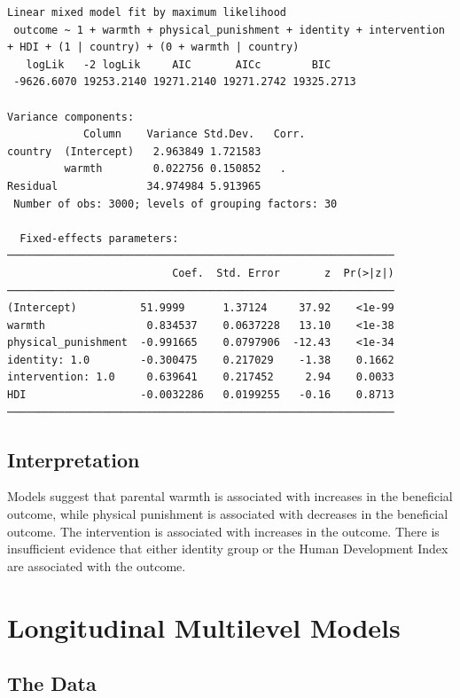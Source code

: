 \documentclass[
  letterpaper,
  DIV=11,
  numbers=noendperiod]{scrreprt}
\begin{document}
\begin{verbatim}
Linear mixed model fit by maximum likelihood
 outcome ~ 1 + warmth + physical_punishment + identity + intervention + HDI + (1 | country) + (0 + warmth | country)
   logLik   -2 logLik     AIC       AICc        BIC    
 -9626.6070 19253.2140 19271.2140 19271.2742 19325.2713

Variance components:
            Column    Variance Std.Dev.   Corr.
country  (Intercept)   2.963849 1.721583
         warmth        0.022756 0.150852   .  
Residual              34.974984 5.913965
 Number of obs: 3000; levels of grouping factors: 30

  Fixed-effects parameters:
─────────────────────────────────────────────────────────────
                          Coef.  Std. Error       z  Pr(>|z|)
─────────────────────────────────────────────────────────────
(Intercept)          51.9999      1.37124     37.92    <1e-99
warmth                0.834537    0.0637228   13.10    <1e-38
physical_punishment  -0.991665    0.0797906  -12.43    <1e-34
identity: 1.0        -0.300475    0.217029    -1.38    0.1662
intervention: 1.0     0.639641    0.217452     2.94    0.0033
HDI                  -0.0032286   0.0199255   -0.16    0.8713
─────────────────────────────────────────────────────────────
\end{verbatim}

\section{Interpretation}\label{interpretation-2}

Models suggest that parental warmth is associated with increases in the
beneficial outcome, while physical punishment is associated with
decreases in the beneficial outcome. The intervention is associated with
increases in the outcome. There is insufficient evidence that either
identity group or the Human Development Index are associated with the
outcome.


\chapter{Longitudinal Multilevel
Models}\label{longitudinal-multilevel-models}

\section{The Data}\label{the-data}
\end{document}
